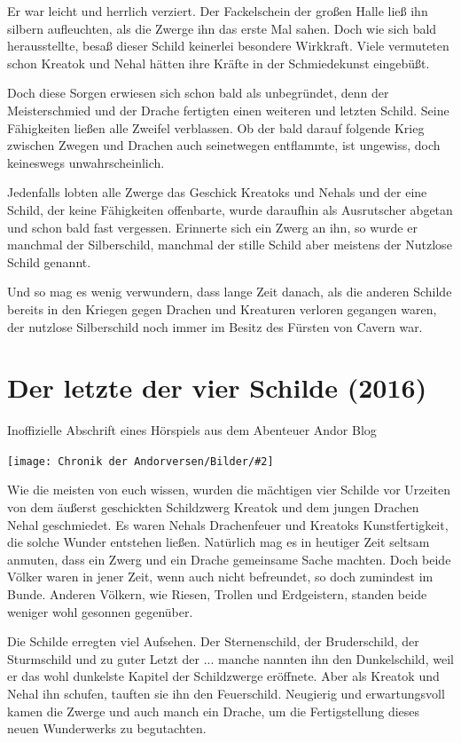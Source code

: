 \documentclass[10pt, a4paper, oneside]{book}
\newcommand{\fillbreak}{\vspace*{\fill}\columnbreak}
\newcommand{\storytext}[1]{%
    \section{#1}%
    \label{Storytext: #1}%
}
\newcommand{\bildmitts}[2][height=0.32\textwidth,width=0.48\textwidth,keepaspectratio]{%
    \begin{center}
        \texttt{[image: Chronik der Andorversen/Bilder/\#2]}
    \end{center}
}
\begin{document}
\begin{multicols}{2}
Er war leicht und herrlich verziert. Der Fackelschein der großen Halle ließ ihn silbern aufleuchten, als die Zwerge ihn das erste Mal sahen. Doch wie sich bald herausstellte, besaß dieser Schild keinerlei besondere Wirkkraft. Viele vermuteten schon Kreatok und Nehal hätten ihre Kräfte in der Schmiedekunst eingebüßt.\bigskip

Doch diese Sorgen erwiesen sich schon bald als unbegründet, denn der Meisterschmied und der Drache fertigten einen weiteren und letzten Schild. Seine Fähigkeiten ließen alle Zweifel verblassen. Ob der bald darauf folgende Krieg zwischen Zwegen und Drachen auch seinetwegen entflammte, ist ungewiss, doch keineswegs unwahrscheinlich.

Jedenfalls lobten alle Zwerge das Geschick Kreatoks und Nehals und der eine Schild, der keine Fähigkeiten offenbarte, wurde daraufhin als Ausrutscher abgetan und schon bald fast vergessen. Erinnerte sich ein Zwerg an ihn, so wurde er manchmal der Silberschild, manchmal der stille Schild aber meistens der Nutzlose Schild genannt.\bigskip

Und so mag es wenig verwundern, dass lange Zeit danach, als die anderen Schilde bereits in den Kriegen gegen Drachen und Kreaturen verloren gegangen waren, der nutzlose Silberschild noch immer im Besitz des Fürsten von Cavern war.




\fillbreak
\storytext{Der letzte der vier Schilde (2016)}

\begin{center}
    Inoffizielle Abschrift eines Hörspiels aus dem Abenteuer Andor Blog
\end{center}

\bildmitts{Kreatok und Nehal.jpeg}

Wie die meisten von euch wissen, wurden die mächtigen vier Schilde vor Urzeiten von dem äußerst geschickten Schildzwerg Kreatok und dem jungen Drachen Nehal geschmiedet. Es waren Nehals Drachenfeuer und Kreatoks Kunstfertigkeit, die solche Wunder entstehen ließen. Natürlich mag es in heutiger Zeit seltsam anmuten, dass ein Zwerg und ein Drache gemeinsame Sache machten. Doch beide Völker waren in jener Zeit, wenn auch nicht befreundet, so doch zumindest im Bunde. Anderen Völkern, wie Riesen, Trollen und Erdgeistern, standen beide weniger wohl gesonnen gegenüber.

Die Schilde erregten viel Aufsehen. Der Sternenschild, der Bruderschild, der Sturmschild und zu guter Letzt der ... manche nannten ihn den Dunkelschild, weil er das wohl dunkelste Kapitel der Schildzwerge eröffnete. Aber als Kreatok und Nehal ihn schufen, tauften sie ihn den Feuerschild. Neugierig und erwartungsvoll kamen die Zwerge und auch manch ein Drache, um die Fertigstellung dieses neuen Wunderwerks zu begutachten. 


\end{multicols}
\end{document}
